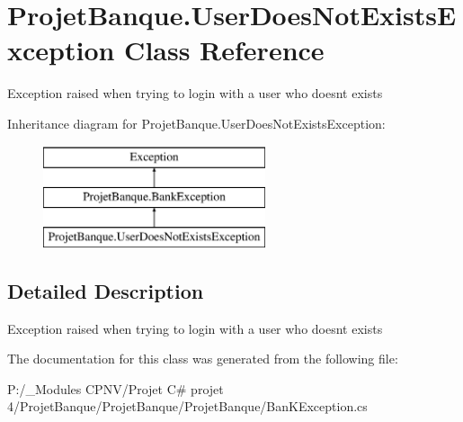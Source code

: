 \hypertarget{class_projet_banque_1_1_user_does_not_exists_exception}{}\section{Projet\+Banque.\+User\+Does\+Not\+Exists\+Exception Class Reference}
\label{class_projet_banque_1_1_user_does_not_exists_exception}


Exception raised when trying to login with a user who doesn\textquotesingle{}t exists  


Inheritance diagram for Projet\+Banque.\+User\+Does\+Not\+Exists\+Exception\+:\begin{figure}[H]
\begin{center}
\leavevmode
\includegraphics[height=3.000000cm]{class_projet_banque_1_1_user_does_not_exists_exception}
\end{center}
\end{figure}


\subsection{Detailed Description}
Exception raised when trying to login with a user who doesn\textquotesingle{}t exists 



The documentation for this class was generated from the following file\+:\begin{DoxyCompactItemize}
\item 
P\+:/\+\_\+\+Modules C\+P\+N\+V/\+Projet C\# projet 4/\+Projet\+Banque/\+Projet\+Banque/\+Projet\+Banque/Ban\+K\+Exception.\+cs\end{DoxyCompactItemize}

